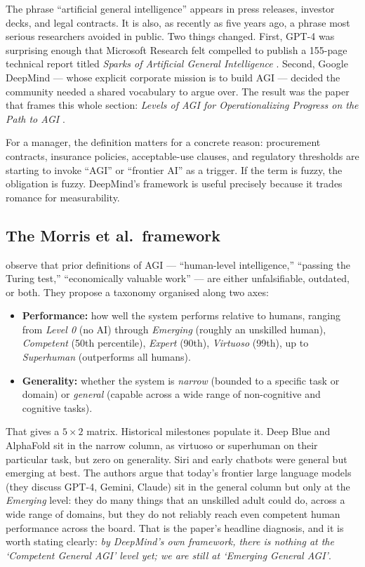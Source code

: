 \documentclass[11pt,a4paper]{article}
\begin{document}
The phrase ``artificial general intelligence'' appears in press
releases, investor decks, and legal contracts. It is also, as recently
as five years ago, a phrase most serious researchers avoided in public.
Two things changed. First, GPT-4 was surprising enough that
Microsoft Research felt compelled to publish a 155-page technical
report titled \emph{Sparks of Artificial General Intelligence}
\citep{bubeck2023sparks}. Second, Google DeepMind --- whose explicit
corporate mission is to build AGI --- decided the community needed a
shared vocabulary to argue over. The result was the paper that frames
this whole section: \emph{Levels of AGI for Operationalizing Progress
on the Path to AGI} \citep{morris2024levels}.

For a manager, the definition matters for a concrete reason: procurement
contracts, insurance policies, acceptable-use clauses, and regulatory
thresholds are starting to invoke ``AGI'' or ``frontier AI'' as a
trigger. If the term is fuzzy, the obligation is fuzzy. DeepMind's
framework is useful precisely because it trades romance for
measurability.

\subsection{The Morris et al.\ framework}

\citet{morris2024levels} observe that prior definitions of AGI ---
``human-level intelligence,'' ``passing the Turing test,''
``economically valuable work'' --- are either unfalsifiable, outdated,
or both. They propose a taxonomy organised along two axes:

\begin{itemize}[leftmargin=1.4em]
  \item \textbf{Performance:} how well the system performs relative to
        humans, ranging from \emph{Level 0} (no AI) through
        \emph{Emerging} (roughly an unskilled human), \emph{Competent}
        (50th percentile), \emph{Expert} (90th), \emph{Virtuoso}
        (99th), up to \emph{Superhuman} (outperforms all humans).
  \item \textbf{Generality:} whether the system is \emph{narrow}
        (bounded to a specific task or domain) or \emph{general}
        (capable across a wide range of non-cognitive and cognitive
        tasks).
\end{itemize}

That gives a \(5\times 2\) matrix. Historical milestones populate it.
Deep Blue and AlphaFold sit in the narrow column, as virtuoso or
superhuman on their particular task, but zero on generality. Siri and
early chatbots were general but emerging at best. The authors argue
that today's frontier large language models (they discuss GPT-4,
Gemini, Claude) sit in the general column but only at the
\emph{Emerging} level: they do many things that an unskilled adult
could do, across a wide range of domains, but they do not reliably
reach even competent human performance across the board. That is the
paper's headline diagnosis, and it is worth stating clearly: \emph{by
DeepMind's own framework, there is nothing at the `Competent General
AGI' level yet; we are still at `Emerging General AGI'\/}.
\end{document}
